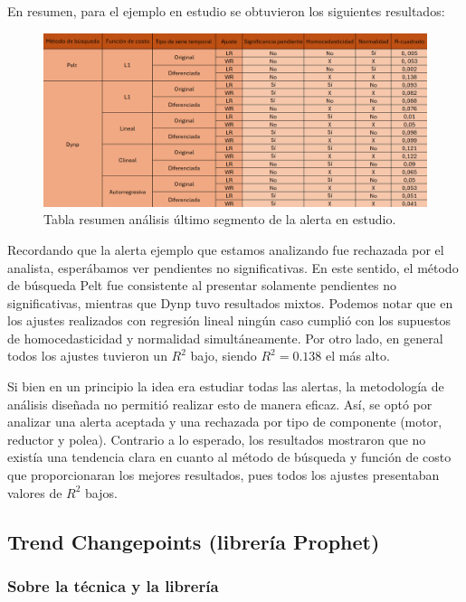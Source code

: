 \documentclass{article}[14pts]
\begin{document}
    En resumen, para el ejemplo en estudio se obtuvieron los siguientes resultados:

      \begin{center}
        \begin{figure}[h]
            \centering
            \includegraphics[width=.85\textwidth]{images/results.png}
            \caption{Tabla resumen análisis último segmento de la alerta en estudio.}
        \end{figure}    
      \end{center}
  
    Recordando que la alerta ejemplo que estamos analizando fue rechazada por el analista, esperábamos ver pendientes no significativas. En este sentido, el método de búsqueda Pelt fue consistente al presentar solamente pendientes no significativas, mientras que Dynp tuvo resultados mixtos. Podemos notar que en los ajustes realizados con regresión lineal ningún caso cumplió con los supuestos de homocedasticidad y normalidad simultáneamente. Por otro lado, en general todos los ajustes tuvieron un $R^{2}$ bajo, siendo $R^{2}= 0.138$ el más alto.

    Si bien en un principio la idea era estudiar todas las alertas, la metodología de análisis diseñada no permitió realizar esto de manera eficaz. Así, se optó por analizar una alerta aceptada y una rechazada por tipo de componente (motor, reductor y polea). Contrario a lo esperado, los resultados mostraron que no existía una tendencia clara en cuanto al método de búsqueda y función de costo que proporcionaran los mejores resultados, pues todos los ajustes presentaban valores de $R^{2}$ bajos.

  \subsection{Trend Changepoints (librería Prophet)}

    \subsubsection{Sobre la técnica y la librería}
\end{document}
